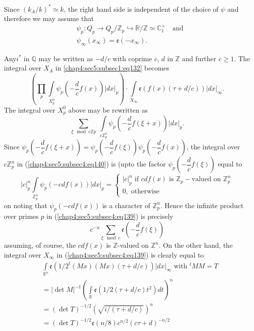 Since $(k_{A}/k)^{\ast}\simeq k$, the right hand side is independent
of the choice of $\psi$ and therefore we may assume that
\begin{align*}
  & \psi_{p}:Q_{p}\to Q_{p}/\mathbb{Z}_{p}\hookrightarrow
  \mathbb{R}/\mathbb{Z}\simeq \mathbb{C}^{\times}_{1}\quad\text{and}\\
  & \psi_{\infty}(x_{\infty})=\mathfrak{e}(-x_{\infty}). 
\end{align*}

Any\pageoriginale $i^{\ast}$ in $\mathbb{Q}$ may be written as $-d/c$
with coprime $c$, $d$ in $\mathbb{Z}$ and further $c\geq 1$. The
integral over $X_{A}$ in \ref{chap4:sec5:subsec1:eq132} becomes
\begin{equation*}
  \left(\prod_{p}\int\limits_{X^{0}_{p}} \psi_{p}
  \left(-\frac{d}{c}f(x) \right)|dx|_{p}\right)\cdot
  \int\limits_{X_{\infty}}\mathfrak{e}(f(x)(\tau+d/c))
  |dx|_{\infty}.\tag{139}\label{chap4:sec5:subsec4:eq139} 
\end{equation*}
The integral over $X^{0}_{p}$ above may be rewritten as 
\begin{equation*}
  \sum_{\xi\mod  c\mathbb{Z}p} ~ \int\limits_{c\mathbb{Z}^{n}_{p}}
  \psi_{p} \left(-\frac{d}{c}f(\xi+x)\right)|dx|_{p}.
  \tag{140}\label{chap4:sec5:subsec4:eq140} 
\end{equation*}
Since
$\psi_{p}\left(-\dfrac{d}{c}f(\xi+x)\right)=\psi_{p}\left(-\dfrac{d}{c}f(\xi)\right)\psi_{p}\left(-\dfrac{d}{c}f(x)\right)$,
the integral over $c\mathbb{Z}^{n}_{p}$ in
(\ref{chap4:sec5:subsec4:eq140}) is (upto the
factor $\psi_{p}\left(-\dfrac{d}{c}f(\xi)\right)$ equal to
$$
|c|^{n}_{p}\int\limits_{\mathbb{Z}^{n}_{p}}\psi_{p}(-cdf(x))|dx|_{p}=
\begin{cases}
|c|^{n}_{p}\text{ if } cdf(x)\text{ is } \mathbb{Z}_{p}-\text{valued
  on } \mathbb{Z}^{n}_{p}\\
0, \text{ otherwise}
\end{cases}
$$
on noting that $\psi_{p}(-cdf(x))$ is a character of
$\mathbb{Z}^{n}_{p}$. Hence the infinite product over primes $p$ in
(\ref{chap4:sec5:subsec4:eq139}) is precisely
\begin{equation*}
  c^{-n}\sum_{\xi\mod
    c}\mathfrak{e}\left(-\frac{d}{c}f(\xi)\right)
  \tag{141}\label{chap4:sec5:subsec4:eq141} 
\end{equation*}
assuming, of course, the $cdf(x)$ is $\mathbb{Z}$-valued on
$\mathbb{Z}^{n}$. On the other hand, the integral over $X_{\infty}$ in
(\ref{chap4:sec5:subsec4:eq139}) is clearly equal to 
\begin{align*}
  & \int\limits_{\mathbb{R}^{n}} \mathfrak{e}(1/2^{t}(Mx) (Mx)
  (\tau+d/c)) |dx|_{\infty}\text{ with } {}^{t}MM=T\\
  &= |\det  M|^{-1}\left(\int\limits_{\mathbb{R}} \mathfrak{e}(1/2
  (\tau+d/c) t^{2})dt\right)^{n}\\ 
  &=(\det T)^{-1/2}\left(\sqrt{i/(\tau+d/c)}\right)^{n}\\
  &= (\det
  T)^{-1/2}\mathfrak{e}(n/8)c^{n/2}(c\tau+d)^{-n/2}
  \tag{142}\label{chap4:sec5:subsec4:eq142} 
\end{align*}

